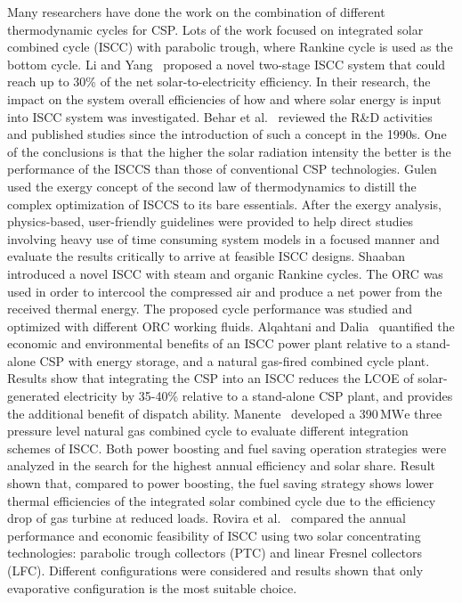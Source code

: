 Many researchers have done the work on the combination of different thermodynamic cycles for CSP. Lots of the work focused on integrated solar combined cycle (ISCC) with parabolic trough, where Rankine cycle is used as the bottom cycle. 
Li and Yang~\cite{Li2014} proposed a novel two-stage ISCC system that could reach up to 30\% of the net solar-to-electricity efficiency. In their research, the impact on the system overall efficiencies of how and where solar energy is input into ISCC system was investigated.
Behar et al.~\cite{Behar2014} reviewed the R\&D activities and published studies since the introduction of such a concept in the 1990s. One of the conclusions is that the higher the solar radiation intensity the better is the performance of the ISCCS than those of conventional CSP technologies.
Gulen ~\cite{Gulen2015} used the exergy concept of the second law of thermodynamics to distill the complex optimization of ISCCS to its bare essentials. After the exergy analysis, physics-based, user-friendly guidelines were provided to help direct studies involving heavy use of time consuming system models in a focused manner and evaluate the results critically to arrive at feasible ISCC designs.
Shaaban ~\cite{Shaaban2016} introduced a novel ISCC with steam and organic Rankine cycles. The ORC was used in order to intercool the compressed air and produce a net power from the received thermal energy. The proposed cycle performance was studied and optimized with different ORC working fluids.
Alqahtani and Dalia~\cite{Alqahtani2016} quantified the economic and environmental benefits of an ISCC power plant relative to a stand-alone CSP with energy storage, and a natural gas-fired combined cycle plant. Results show that integrating the CSP into an ISCC reduces the LCOE of solar-generated electricity by 35-40\% relative to a stand-alone CSP plant, and provides the additional benefit of dispatch ability.
Manente~\cite{Manente2016} developed a 390$\,\mathrm{MWe}$ three pressure level natural gas combined cycle to evaluate different integration schemes of ISCC. Both power boosting and fuel saving operation strategies were analyzed in the search for the highest annual efficiency and solar share. Result shown that, compared to power boosting, the fuel saving strategy shows lower thermal efficiencies of the integrated solar combined cycle due to the efficiency drop of gas turbine at reduced loads.
Rovira et al.~\cite{Rovira2016} compared the annual performance and economic feasibility of ISCC using two solar concentrating technologies: parabolic trough collectors (PTC) and linear Fresnel collectors (LFC). Different configurations were considered and results shown that only evaporative configuration is the most suitable choice.
